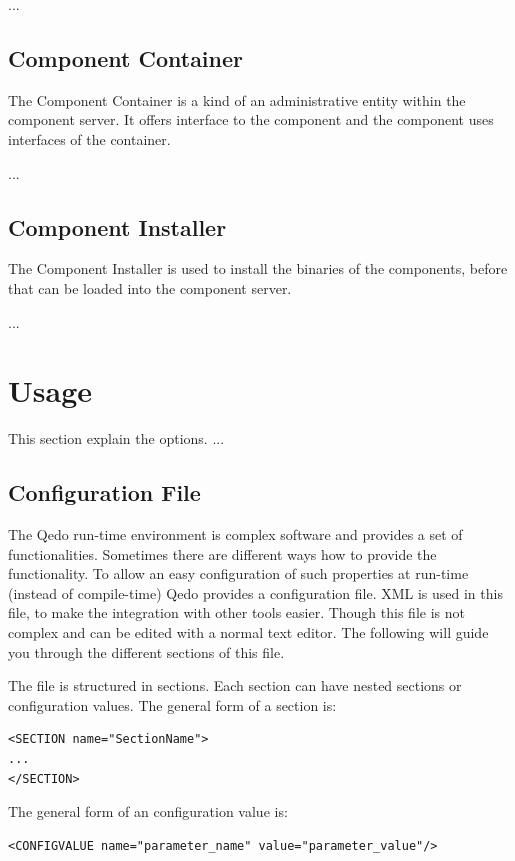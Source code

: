 \documentclass[12pt,a4paper]{report}
\begin{document}
 ... 

\section{Component Container}
\label{sec:ComponentContainer}
The Component Container is a kind of an administrative entity within the component server. It offers interface to the component and the component uses interfaces of the container.

...

\section{Component Installer}
\label{sec:ComponentInstaller}
The Component Installer is used to install the binaries of the components, before that can be loaded into the component server.

...

\chapter{Usage}
\label{sec:Usage}
This section explain the options. ...

\section{Configuration File}
\label{sec:ConfigurationFile}
The Qedo run-time environment is complex software and provides a set of functionalities. Sometimes there are different ways how to provide the functionality. To allow an easy configuration of such properties at run-time (instead of compile-time) Qedo provides a configuration file. XML is used in this file, to make the integration with other tools easier. Though this file is not complex and can be edited with a normal text editor. The following will guide you through the different sections of this file.

The file is structured in sections. Each section can have nested sections or configuration values. The general form of a section is:

\begin{verbatim}
<SECTION name="SectionName">
...
</SECTION>
\end{verbatim}

The general form of an configuration value is:
\begin{verbatim}
<CONFIGVALUE name="parameter_name" value="parameter_value"/>
\end{verbatim}
\end{document}
